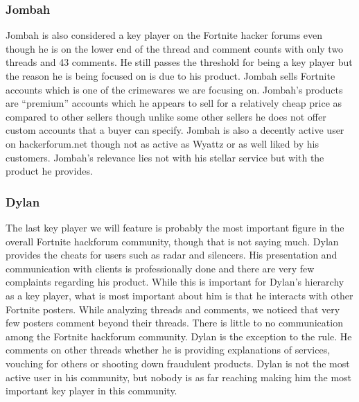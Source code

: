 \documentclass[sigconf]{acmart}
\begin{document}
\subsubsection{Jombah}
Jombah is also considered a key player on the Fortnite hacker forums even though he is on the lower end of the thread and comment counts with only two threads and 43 comments. He still passes the threshold for being a key player but the reason he is being focused on is due to his product. Jombah sells Fortnite accounts which is one of the crimewares we are focusing on. Jombah’s products are “premium” accounts which he appears to sell for a relatively cheap price as compared to other sellers though unlike some other sellers he does not offer custom accounts that a buyer can specify. Jombah is also a decently active user on hackerforum.net though not as active as Wyattz or as well liked by his customers. Jombah’s relevance lies not with his stellar service but with the product he provides.

\subsubsection{Dylan}
The last key player we will feature is probably the most important figure in the overall Fortnite hackforum community, though that is not saying much. Dylan provides the cheats for users such as radar and silencers. His presentation and communication with clients is professionally done and there are very few complaints regarding his product. While this is important for Dylan’s hierarchy as a key player, what is most important about him is that he interacts with other Fortnite posters. While analyzing threads and comments, we noticed that very few posters comment beyond their threads. There is little to no communication among the Fortnite hackforum community. Dylan is the exception to the rule. He comments on other threads whether he is providing explanations of services, vouching for others or shooting down fraudulent products. Dylan is not the most active user in his community, but nobody is as far reaching making him the most important key player in this community.
\end{document}
